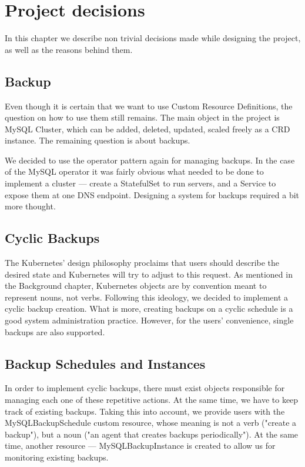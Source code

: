 \chapter{Project decisions}
In this chapter we describe non trivial decisions made while designing the project, as well as the
reasons behind them.

\section{Backup}
Even though it is certain that we want to use Custom Resource Definitions, the question on how to
use them still remains. The main object in the project is MySQL Cluster, which can be added,
deleted, updated, scaled freely as a CRD instance. The remaining question is about backups.

We decided to use the operator pattern again for managing backups. In the case of the MySQL
operator it was fairly obvious what needed to be done to implement a cluster --- create a
StatefulSet to run servers, and a Service to expose them at one DNS endpoint. Designing a system
for backups required a bit more thought.

\section{Cyclic Backups}
The Kubernetes’ design philosophy proclaims that users should describe the desired state and
Kubernetes will try to adjust to this request. As mentioned in the Background chapter, Kubernetes 
objects are by convention meant to represent nouns, not verbs. Following this ideology, we 
decided to implement a cyclic backup creation. What is more, creating backups on a cyclic schedule 
is a good system administration practice. However, for the users’ convenience, single backups are 
also supported.

\section{Backup Schedules and Instances}
In order to implement cyclic backups, there must exist objects responsible for managing each one of
these repetitive actions. At the same time, we have to keep track of existing backups. Taking this
into account, we provide users with the MySQLBackupSchedule custom resource, whose meaning is not a
verb ("create a backup"), but a noun ("an agent that creates backups periodically"). At the same
time, another resource --- MySQLBackupInstance is created to allow us for monitoring existing
backups. 

